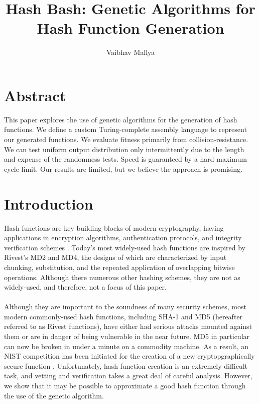 \documentclass{article}
\begin{document}
\title{Hash Bash: Genetic Algorithms for Hash Function Generation}
\author{Vaibhav Mallya}
\maketitle
\section{Abstract}


This paper explores the use of genetic algorithms for the generation of hash functions. We define a custom Turing-complete assembly language to represent our generated functions. We evaluate fitness primarily from collision-resistance. We can test uniform output distribution only intermittently due to the length and expense of the randomness tests. Speed is guaranteed by a hard maximum cycle limit. Our results are limited, but we believe the approach is promising.

\section{Introduction}
Hash functions are key building blocks of modern cryptography, having applications in encryption algorithms, authentication protocols, and integrity verification schemes \cite{Cohen}. Today's most widely-used hash functions are inspired by Rivest's MD2 \cite{RivestMD2} and MD4, the designs of which are characterized by input chunking, substitution, and the repeated application of overlapping bitwise operations. Although there numerous other hashing schemes, they are not as widely-used, and therefore, not a focus of this paper.

\paragraph{}
Although they are important to the soundness of many security schemes, most modern commonly-used hash functions, including SHA-1 and MD5 (hereafter referred to as Rivest functions), have either had serious attacks mounted against them or are in danger of being vulnerable in the near future.
MD5 in particular can now be broken in under a minute on a commodity machine. \cite{cryptoeprint:2005:067} As a result, an NIST competition has been initiated for the creation of a new cryptopgraphically secure function \cite{NISTComp}. Unfortunately, hash function creation is an extremely difficult task, and vetting and verification takes a great deal of careful analysis.
However, we show that it may be possible to approximate a good hash function through the use of the genetic algorithm.
\end{document}
